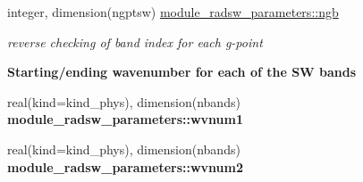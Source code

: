 \begin{Indent}
\begin{DoxyCompactItemize}
\mbox{\label{namespacemodule__radsw__parameters_afdd8496d7eaa017f7f1e08e998945c1e}} 
integer, dimension(ngptsw) \hyperlink{namespacemodule__radsw__parameters_afdd8496d7eaa017f7f1e08e998945c1e}{module\+\_\+radsw\+\_\+parameters\+::ngb}
\begin{DoxyCompactList}\small\item\em reverse checking of band index for each g-\/point \end{DoxyCompactList}\end{DoxyCompactItemize}
\end{Indent}
\begin{Indent}\textbf{ Starting/ending wavenumber for each of the SW bands}\par
\begin{DoxyCompactItemize}
\item 
\mbox{\label{namespacemodule__radsw__parameters_adc7827bd2bed6502a0a60b40b8f1deeb}} 
real(kind=kind\+\_\+phys), dimension(nbands) {\bfseries module\+\_\+radsw\+\_\+parameters\+::wvnum1}
\item 
\mbox{\label{namespacemodule__radsw__parameters_a88594ac7d3fbf13f2fdbac4b3b844d88}} 
real(kind=kind\+\_\+phys), dimension(nbands) {\bfseries module\+\_\+radsw\+\_\+parameters\+::wvnum2}
\end{DoxyCompactItemize}
\end{Indent}
